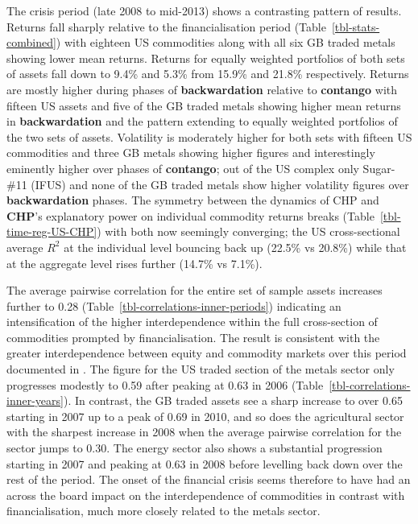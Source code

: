 \documentclass[
  authoryear,
  preprint,
  3p]{elsarticle}
\begin{document}
\bigskip
\bigskip

The crisis period (late 2008 to mid-2013) shows a contrasting pattern of
results. Returns fall sharply relative to the financialisation period
(Table~\ref{tbl-stats-combined}) with eighteen US commodities along with
all six GB traded metals showing lower mean returns. Returns for equally
weighted portfolios of both sets of assets fall down to 9.4\% and 5.3\%
from 15.9\% and 21.8\% respectively. Returns are mostly higher during
phases of \textbf{backwardation} relative to \textbf{contango} with
fifteen US assets and five of the GB traded metals showing higher mean
returns in \textbf{backwardation} and the pattern extending to equally
weighted portfolios of the two sets of assets. Volatility is moderately
higher for both sets with fifteen US commodities and three GB metals
showing higher figures and interestingly eminently higher over phases of
\textbf{contango}; out of the US complex only Sugar-\#11 (IFUS) and none
of the GB traded metals show higher volatility figures over
\textbf{backwardation} phases. The symmetry between the dynamics of CHP
and \textbf{CHP}'s explanatory power on individual commodity returns
breaks (Table~\ref{tbl-time-reg-US-CHP}) with both now seemingly
converging; the US cross-sectional average \(R^{2}\) at the individual
level bouncing back up (22.5\% vs 20.8\%) while that at the aggregate
level rises further (14.7\% vs 7.1\%).

\medskip

The average pairwise correlation for the entire set of sample assets
increases further to 0.28 (Table~\ref{tbl-correlations-inner-periods})
indicating an intensification of the higher interdependence within the
full cross-section of commodities prompted by financialisation. The
result is consistent with the greater interdependence between equity and
commodity markets over this period documented in
\citet{silvennoinen_financialisation_2013}. The figure for the US traded
section of the metals sector only progresses modestly to 0.59 after
peaking at 0.63 in 2006 (Table~\ref{tbl-correlations-inner-years}). In
contrast, the GB traded assets see a sharp increase to over 0.65
starting in 2007 up to a peak of 0.69 in 2010, and so does the
agricultural sector with the sharpest increase in 2008 when the average
pairwise correlation for the sector jumps to 0.30. The energy sector
also shows a substantial progression starting in 2007 and peaking at
0.63 in 2008 before levelling back down over the rest of the period. The
onset of the financial crisis seems therefore to have had an across the
board impact on the interdependence of commodities in contrast with
financialisation, much more closely related to the metals sector.
\end{document}
